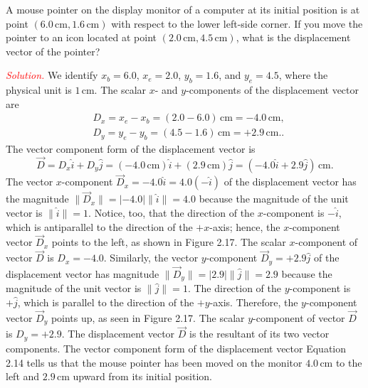 \documentclass{report}
\begin{document}
    \pagebreak 
    \begin{exm}
        A mouse pointer on the display monitor of a computer at its initial position is at point $(6.0\, \text{cm}, 1.6\, \text{cm})$ with respect to the lower left-side corner. If you move the pointer to an icon located at point $(2.0\, \text{cm}, 4.5\, \text{cm})$, what is the displacement vector of the pointer?
    \end{exm}
    \bigbreak \noindent 
    \textcolor{red}{\textit{Solution.}}
    We identify $x_b = 6.0$, $x_e = 2.0$, $y_b = 1.6$, and $y_e = 4.5$, where the physical unit is $1\, \text{cm}$. The scalar $x$- and $y$-components of the displacement vector are
    \begin{align*}
        &D_x = x_e - x_b = (2.0 - 6.0)\, \text{cm} = -4.0\, \text{cm}, \\
        &D_y = y_e - y_b = (4.5 - 1.6)\, \text{cm} = +2.9\, \text{cm}.
    .\end{align*}
    The vector component form of the displacement vector is
    \[
        \vec{D} = D_x \hat{i} + D_y \hat{j} = (-4.0\, \text{cm}) \hat{i} + (2.9\, \text{cm}) \hat{j} = (-4.0 \hat{i} + 2.9 \hat{j})\, \text{cm}.
    \]
    \bigbreak \noindent 
    \bigbreak \noindent 
    The vector $x$-component $\vec{D}_x = -4.0 \hat{i} = 4.0(-\hat{i})$ of the displacement vector has the magnitude $\lVert \vec{D}_x \rVert = \lvert -4.0 \rvert \lVert \hat{i} \rVert = 4.0$ because the magnitude of the unit vector is $\lVert \hat{i} \rVert = 1$. Notice, too, that the direction of the $x$-component is $-\hat{i}$, which is antiparallel to the direction of the $+x$-axis; hence, the $x$-component vector $\vec{D}_x$ points to the left, as shown in Figure 2.17. The scalar $x$-component of vector $\vec{D}$ is $D_x = -4.0$.
    \bigbreak \noindent 
    Similarly, the vector $y$-component $\vec{D}_y = +2.9 \hat{j}$ of the displacement vector has magnitude $\lVert \vec{D}_y \rVert = \lvert 2.9 \rvert \lVert \hat{j} \rVert = 2.9$ because the magnitude of the unit vector is $\lVert \hat{j} \rVert = 1$. The direction of the $y$-component is $+\hat{j}$, which is parallel to the direction of the $+y$-axis. Therefore, the $y$-component vector $\vec{D}_y$ points up, as seen in Figure 2.17. The scalar $y$-component of vector $\vec{D}$ is $D_y = +2.9$. The displacement vector $\vec{D}$ is the resultant of its two vector components.
    \bigbreak \noindent 
    The vector component form of the displacement vector Equation 2.14 tells us that the mouse pointer has been moved on the monitor $4.0\, \text{cm}$ to the left and $2.9\, \text{cm}$ upward from its initial position.
\end{document}
